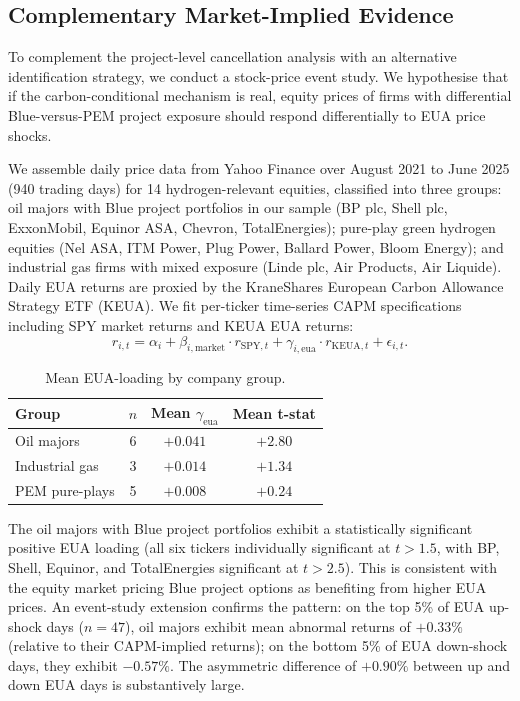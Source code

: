 \documentclass[11pt,a4paper]{article}
\begin{document}
\subsection{Complementary Market-Implied Evidence}
\label{sec:ch7-event-study}

To complement the project-level cancellation analysis with an alternative identification strategy, we conduct a stock-price event study. We hypothesise that if the carbon-conditional mechanism is real, equity prices of firms with differential Blue-versus-PEM project exposure should respond differentially to EUA price shocks.

We assemble daily price data from Yahoo Finance over August 2021 to June 2025 (940 trading days) for 14 hydrogen-relevant equities, classified into three groups: oil majors with Blue project portfolios in our sample (BP plc, Shell plc, ExxonMobil, Equinor ASA, Chevron, TotalEnergies); pure-play green hydrogen equities (Nel ASA, ITM Power, Plug Power, Ballard Power, Bloom Energy); and industrial gas firms with mixed exposure (Linde plc, Air Products, Air Liquide). Daily EUA returns are proxied by the KraneShares European Carbon Allowance Strategy ETF (KEUA). We fit per-ticker time-series CAPM specifications including SPY market returns and KEUA EUA returns:
\begin{equation}
r_{i,t} = \alpha_i + \beta_{i,\mathrm{market}} \cdot r_{\mathrm{SPY},t} + \gamma_{i,\mathrm{eua}} \cdot r_{\mathrm{KEUA},t} + \epsilon_{i,t}.
\end{equation}

\begin{table}[h!]
\centering
\caption{Mean EUA-loading by company group.}
\begin{tabular}{lccc}
\toprule
Group & $n$ & Mean $\gamma_{\mathrm{eua}}$ & Mean t-stat \\
\midrule
Oil majors & 6 & $+0.041$ & $+2.80$ \\
Industrial gas & 3 & $+0.014$ & $+1.34$ \\
PEM pure-plays & 5 & $+0.008$ & $+0.24$ \\
\bottomrule
\end{tabular}
\label{tab:ch7-eua-loading}
\end{table}

The oil majors with Blue project portfolios exhibit a statistically significant positive EUA loading (all six tickers individually significant at $t > 1.5$, with BP, Shell, Equinor, and TotalEnergies significant at $t > 2.5$). This is consistent with the equity market pricing Blue project options as benefiting from higher EUA prices. An event-study extension confirms the pattern: on the top 5\% of EUA up-shock days ($n=47$), oil majors exhibit mean abnormal returns of $+0.33\%$ (relative to their CAPM-implied returns); on the bottom 5\% of EUA down-shock days, they exhibit $-0.57\%$. The asymmetric difference of $+0.90\%$ between up and down EUA days is substantively large.
\end{document}
